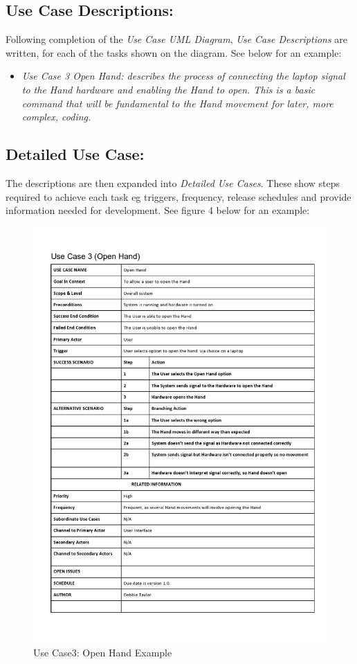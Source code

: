 \documentclass[progress]{cmpreport}
\begin{document}
{{{{{\subsection{Use Case Descriptions:}

Following completion of the \textit{Use Case UML Diagram}, \textit{Use Case Descriptions} are written, for each of the tasks shown on the diagram. See below for an example:
\begin{itemize}		
	\item \textit{Use Case 3 Open Hand: describes the process of connecting the laptop signal to the Hand hardware and enabling the Hand to open. This is a basic command that will be fundamental to the Hand movement for later, more complex, coding.}
\end{itemize}

\subsection{Detailed Use Case:}

The descriptions are then expanded into \textit{Detailed Use Cases}. These show steps required to achieve each task eg triggers, frequency, release schedules and provide information needed for development. See figure 4 below for an example:
\begin{figure}[H] 
	\caption{Use Case3: Open Hand Example}
	\centering
	\includegraphics[trim=0cm 7cm 0cm 0.63cm, width=1.0 \textwidth, height=0.625 \textheight]{photos/UseCase_OpenHand.jpg}
\end{figure}

}}}}}
\end{document}
